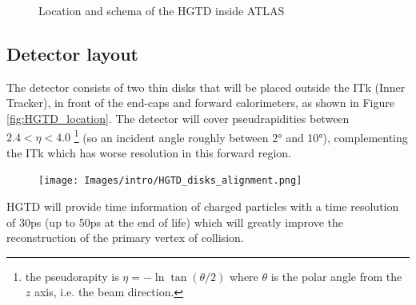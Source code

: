 \begin{figure}[!ht]
    \centering
    \hfill
    \centering
    \caption{Location and schema of the HGTD inside ATLAS}
\end{figure}

\subsection{Detector layout}\label{subsec:HGTD_layout}

The detector consists of two thin disks that will be placed outside the ITk (Inner Tracker), in front of the end-caps and forward calorimeters, as shown in Figure \ref{fig:HGTD_location}.
The detector will cover pseudrapidities between $2.4 < \eta < 4.0$ \footnote{the pseudorapity is $\eta=-\ln \tan(\theta/2)$ where $\theta$ is the polar angle from the $z$ axis, i.e. the beam direction.} (so an incident angle roughly between 2° and 10°), complementing the ITk which has worse resolution in this forward region. %

\begin{figure}
    \centering
    \texttt{[image: Images/intro/HGTD\_disks\_alignment.png]}
\end{figure}


HGTD will provide time information of charged particles with a time resolution of 30ps (up to 50ps at the end of life) which will greatly improve the reconstruction of the primary vertex of collision.

